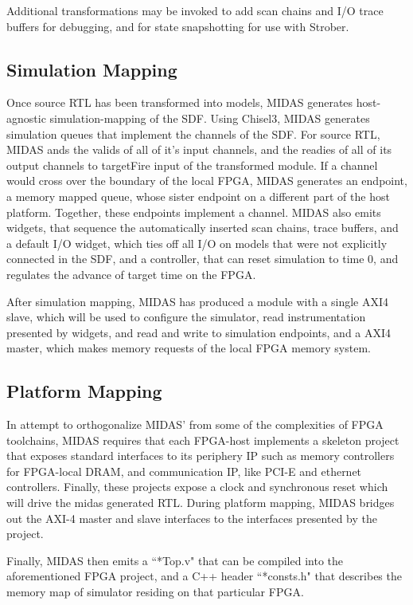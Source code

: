 Additional transformations may be invoked to add scan chains and I/O trace
buffers for debugging, and for state snapshotting for use with
Strober\cite{strober}.

\subsection{Simulation Mapping}

Once source RTL has been transformed into models, MIDAS generates host-agnostic
simulation-mapping of the SDF. Using Chisel3, MIDAS generates simulation queues
that implement the channels of the SDF. For source RTL, MIDAS ands the valids
of all of it's input channels, and the readies of all of its output channels to
targetFire input of the transformed module. If a channel would cross over the
boundary of the local FPGA, MIDAS generates an endpoint, a memory mapped queue,
whose sister endpoint on a different part of the host platform. Together, these
endpoints implement a channel.  MIDAS also emits widgets, that sequence the
automatically inserted scan chains, trace buffers, and a default I/O widget,
which ties off all I/O on models that were not explicitly connected in the SDF,
and a controller, that can reset simulation to time 0, and regulates the
advance of target time on the FPGA.

After simulation mapping, MIDAS has produced a module with a single AXI4 slave,
which will be used to configure the simulator, read instrumentation presented
by widgets, and read and write to simulation endpoints, and a AXI4 master,
which makes memory requests of the local FPGA memory system.


\subsection{Platform Mapping}

In attempt to orthogonalize MIDAS' from some of the complexities of FPGA
toolchains, MIDAS requires that each FPGA-host implements a skeleton project
that exposes standard interfaces to its periphery IP such as  memory
controllers for FPGA-local DRAM, and communication IP, like PCI-E and ethernet
controllers. Finally, these projects expose a clock and synchronous reset which
will drive the midas generated RTL.  During platform mapping, MIDAS bridges out
the AXI-4 master and slave interfaces to the interfaces presented by the
project.

Finally, MIDAS then emits a ``*Top.v" that can be compiled into the
aforementioned FPGA project, and a C++ header ``*consts.h" that describes the
memory map of simulator residing on that particular FPGA.

